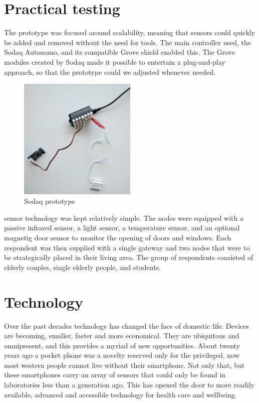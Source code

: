 \documentclass{below-ext}
\begin{document}
\section{Practical testing}
The prototype was focused around scalability, meaning that sensors could quickly be added and removed without the need for tools. The main controller used, the Sodaq Autonomo, and its compatible Grove shield enabled this. The Grove modules created by Sodaq made it possible to entertain a plug-and-play approach, so that the prototype could we adjusted whenever needed. 
\begin{figure}
\label{fig:sodaq}
\includegraphics[width=0.5\textwidth]{sodaq}
\caption{Sodaq prototype}
\end{figure}
sensor technology was kept relatively simple. The nodes were equipped with a passive infrared sensor, a light sensor, a temperature sensor, and an optional magnetig door sensor to monitor the opening of doors and windows. Each respondent was then supplied with a single gateway and two nodes that were to be strategically placed in their living area. The group of respondents consisted of elderly couples, single elderly people, and students. %

\section{Technology}
Over the past decades technology has changed the face of domestic life. Devices are becoming, smaller, faster and more economical. They are ubiquitous and omnipresent, and this provides a myriad of new opportunities. About twenty years ago a pocket phone was a novelty reserved only for the privileged, now most western people cannot live without their smartphone. Not only that, but these smartphones carry an array of sensors that could only be found in laboratories less than a generation ago. This has opened the door to more readily available, advanced and accessible technology for health care and wellbeing.
\end{document}

